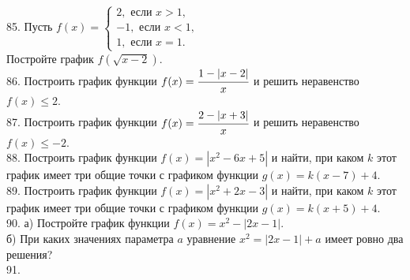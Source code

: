 \documentclass[12pt]{article}
\begin{document}
85. Пусть $f(x)=\begin{cases} 2, \text{ если } x>1,\\ -1, \text{ если } x<1,\\ 1, \text{ если } x=1.\end{cases}$\\
Постройте график $f(\sqrt{x-2}).$\\
86. Построить график функции $f(x)=\cfrac{1-|x-2|}{x}$ и решить неравенство $f(x)\leqslant 2.$\\
87. Построить график функции $f(x)=\cfrac{2-|x+3|}{x}$ и решить неравенство $f(x)\leqslant -2.$\\
88. Построить график функции $f(x)=|x^2-6x+5|$ и найти, при каком $k$ этот график имеет три общие точки с графиком функции $g(x)=k(x-7)+4.$\\
89. Построить график функции $f(x)=|x^2+2x-3|$ и найти, при каком $k$ этот график имеет три общие точки с графиком функции $g(x)=k(x+5)+4.$\\
90. а) Постройте график функции $f(x)=x^2-|2x-1|.$\\
б) При каких значениях параметра $a$ уравнение $x^2=|2x-1|+a$ имеет ровно два решения?\\
91. \begin{figure}[ht!]
\end{figure}\\
\end{document}
